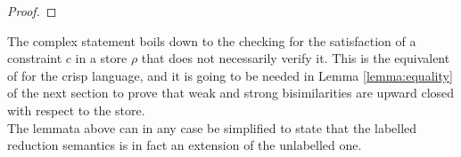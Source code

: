 \documentclass[main.tex]{subfiles}
\begin{document}
\begin{proof}
\end{proof}

The complex statement boils down to the checking for the satisfaction of a constraint $c$
 in a store $\rho$ that does not necessarily verify it.
%
This is the equivalent of \cite[Lemma 5]{pippo} for the crisp language, and it is going to be needed in 
Lemma \ref{lemma:equality} of the next section to prove that weak and strong bisimilarities are 
upward closed with respect to the store.
\\


The lemmata above can in any case be simplified to state that the labelled reduction semantics is in fact an extension of the unlabelled one.
\end{document}
